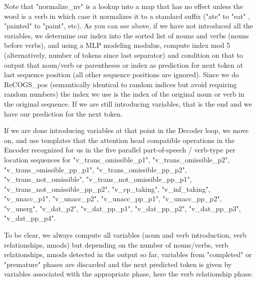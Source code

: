 \documentclass[11pt]{article}
\begin{document}
Note that "normalize\_nv" is a lookup into a map that has no effect unless the word is a verb in which case it normalizes it to a standard suffix ("ate" to "eat" , "painted" to "paint", etc).
\clearpage
As you can see above, if we have not introduced all the variables, we determine our index into the sorted list of nouns and verbs (nouns before verbs), and using a MLP modeling modulus, compute index mod 5 (alternatively, number of tokens since last separator)  and condition on that to output that noun/verb or parentheses or index as prediction for next token at last sequence position (all other sequence positions are ignored). Since we do ReCOGS\_pos (semantically identical to random indices but avoid requiring random numbers) the index we use is the index of the original noun or verb in the original sequence. If we are still introducing variables, that is the end and we have our prediction for the next token.

If we are done introducing variables at that point in the Decoder loop, we move on,
and use templates that the attention head compatible operations in the Encoder recognized for us in the five parallel part-of-speech / verb-type per location sequences for "v\_trans\_omissible\_p1", "v\_trans\_omissible\_p2", "v\_trans\_omissible\_pp\_p1", "v\_trans\_omissible\_pp\_p2", "v\_trans\_not\_omissible", "v\_trans\_not\_omissible\_pp\_p1", "v\_trans\_not\_omissible\_pp\_p2", "v\_cp\_taking", "v\_inf\_taking", "v\_unacc\_p1", "v\_unacc\_p2", "v\_unacc\_pp\_p1", "v\_unacc\_pp\_p2", "v\_unerg", "v\_dat\_p2", "v\_dat\_pp\_p1", "v\_dat\_pp\_p2",  "v\_dat\_pp\_p3",  "v\_dat\_pp\_p4".

To be clear, we always compute all variables (noun and verb introduction, verb relationships, nmods) but depending on the number of nouns/verbs, verb relationships, nmods detected in the output so far, variables from "completed" or "premature" phases are discarded and the next predicted token is given by variables associated with the appropriate phase, here the verb relationship phase.
\end{document}
